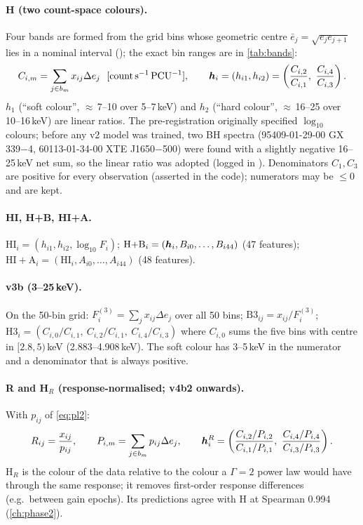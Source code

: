 \paragraph{H (two count-space colours).} Four bands are formed from the grid bins whose geometric centre
$\bar e_j=\sqrt{e_je_{j+1}}$ lies in a nominal interval (); the exact bin ranges are in \cref{tab:bands}:
\begin{equation}
C_{i,m} = \sum_{j\in b_m} x_{ij}\Delta e_j\ \ [\mathrm{count\,s^{-1}\,PCU^{-1}}],\qquad
\vect{h}_i = (h_{i1},h_{i2}) = \left(\frac{C_{i,2}}{C_{i,1}},\ \frac{C_{i,4}}{C_{i,3}}\right). \label{eq:H}
\end{equation}
$h_1$ (``soft colour'', $\approx$\,7--10 over 5--7\,keV) and $h_2$ (``hard colour'', $\approx$\,16--25 over 10--16\,keV) are
linear ratios. The pre-registration originally specified $\log_{10}$ colours; before any v2 model was trained, two BH
spectra (95409-01-29-00 GX\,339$-$4, 60113-01-34-00 XTE J1650$-$500) were found with a slightly negative 16--25\,keV net
sum, so the linear ratio was adopted (logged in ). Denominators $C_1, C_3$ are positive
for every observation (asserted in the code); numerators may be $\le 0$ and are kept.

\paragraph{HI, H+B, HI+A.} $\mathrm{HI}_i = (h_{i1},h_{i2},\log_{10}F_i)$; $\mathrm{H{+}B}_i = (\bm{h}_i, B_{i0},\dots,B_{i44})$
(47 features); $\mathrm{HI{+}A}_i = (\mathrm{HI}_i, A_{i0},\dots,A_{i44})$ (48 features).

\paragraph{v3b (3--25\,keV).} On the 50-bin grid: $F^{(3)}_i=\sum_{j}x_{ij}\Delta e_j$ over all 50 bins;
$\mathrm{B3}_{ij} = x_{ij}/F^{(3)}_i$; $\mathrm{H3}_i = (C_{i,0}/C_{i,1},\ C_{i,2}/C_{i,1},\ C_{i,4}/C_{i,3})$ where
$C_{i,0}$ sums the five bins with centre in $[2.8,5)$\,keV (2.883--4.908\,keV). The soft colour has 3--5\,keV in the
numerator and a denominator that is always positive.

\paragraph{R and H$_R$ (response-normalised; v4b2 onwards).} With $p_{ij}$ of \cref{eq:pl2}:
\begin{equation}
R_{ij} = \frac{x_{ij}}{p_{ij}},\qquad P_{i,m} = \sum_{j\in b_m}p_{ij}\Delta e_j,\qquad
\vect{h}^{R}_i = \left(\frac{C_{i,2}/P_{i,2}}{C_{i,1}/P_{i,1}},\ \frac{C_{i,4}/P_{i,4}}{C_{i,3}/P_{i,3}}\right). \label{eq:HR}
\end{equation}
H$_R$ is the colour of the data relative to the colour a $\Gamma=2$ power law would have through the same response; it
removes first-order response differences (e.g.\ between gain epochs). Its predictions agree with H at Spearman 0.994
(\cref{ch:phase2}).

